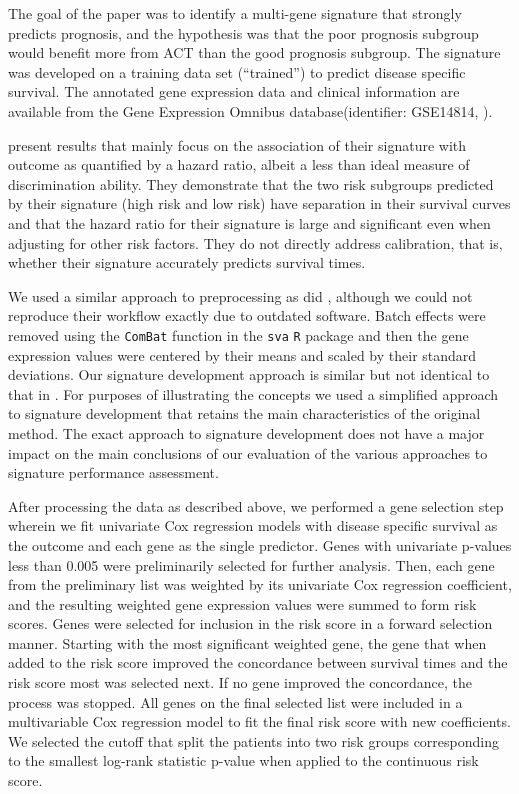 \documentclass[11pt,]{article}
\begin{document}
The goal of the \citet{zhu2010prognostic} paper was to identify a
multi-gene signature that strongly predicts prognosis, and the
hypothesis was that the poor prognosis subgroup would benefit more from
ACT than the good prognosis subgroup. The signature was developed on a
training data set (``trained'') to predict disease specific survival.
The annotated gene expression data and clinical information are
available from the Gene Expression Omnibus database(identifier:
GSE14814, \citet{edgar2002gene}).

\citet{zhu2010prognostic} present results that mainly focus on the
association of their signature with outcome as quantified by a hazard
ratio, albeit a less than ideal measure of discrimination ability. They
demonstrate that the two risk subgroups predicted by their signature
(high risk and low risk) have separation in their survival curves and
that the hazard ratio for their signature is large and significant even
when adjusting for other risk factors. They do not directly address
calibration, that is, whether their signature accurately predicts
survival times.

We used a similar approach to preprocessing as did
\citet{zhu2010prognostic}, although we could not reproduce their
workflow exactly due to outdated software. Batch effects were removed
using the \texttt{ComBat} function in the \texttt{sva} \texttt{R}
package \citep{leeksva} and then the gene expression values were
centered by their means and scaled by their standard deviations. Our
signature development approach is similar but not identical to that in
\citet{zhu2010prognostic}. For purposes of illustrating the concepts we
used a simplified approach to signature development that retains the
main characteristics of the original method. The exact approach to
signature development does not have a major impact on the main
conclusions of our evaluation of the various approaches to signature
performance assessment.

After processing the data as described above, we performed a gene
selection step wherein we fit univariate Cox regression models with
disease specific survival as the outcome and each gene as the single
predictor. Genes with univariate p-values less than 0.005 were
preliminarily selected for further analysis. Then, each gene from the
preliminary list was weighted by its univariate Cox regression
coefficient, and the resulting weighted gene expression values were
summed to form risk scores. Genes were selected for inclusion in the
risk score in a forward selection manner. Starting with the most
significant weighted gene, the gene that when added to the risk score
improved the concordance between survival times and the risk score most
was selected next. If no gene improved the concordance, the process was
stopped. All genes on the final selected list were included in a
multivariable Cox regression model to fit the final risk score with new
coefficients. We selected the cutoff that split the patients into two
risk groups corresponding to the smallest log-rank statistic p-value
when applied to the continuous risk score.
\end{document}
